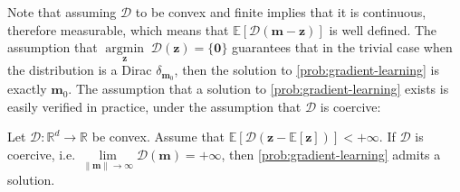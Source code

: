 \documentclass[10pt]{article} %
\renewcommand{\vec}[1]{\bm{#1}}
\newcommand{\bz}{\bm{z}}
\newcommand{\m}{\bm{m}}
\DeclareMathOperator{\argmininn}{argmin}
\newcommand{\argmin}[1]{ \underset{#1}{\argmininn} \;}
\newcommand{\E}[1]{\mathbb{E}\left[#1\right] }
\newcommand{\dist}{\mathcal{D}}
\begin{document}
Note that assuming $\mathcal{D}$ to be convex and finite implies that it is continuous, therefore measurable, which means that $\E{ \dist(\vec{m}-\vec{z})}$ is well defined.
The assumption that $\argmin{\vec{z}}\mathcal{D}(\vec{z})= \{\vec{0}\}$ guarantees that in the trivial case when the distribution is a Dirac $\delta_{\m_0}$, then the solution to  \eqref{prob:gradient-learning} is exactly $\m_0$.
The assumption that a solution to \eqref{prob:gradient-learning} exists is easily verified in practice, under the assumption that $\dist$ is coercive:

\begin{lemma}\label{L:D coercive implies median exists}
    Let $\dist : \mathbb{R}^d \to \mathbb{R}$ be convex.
    Assume that $\mathbb{E}\left[ \mathcal{D}(\bz - \mathbb{E}\left[ \bz \right]) \right] < + \infty$. 
    If $\dist$ is coercive, i.e. $\lim\limits_{\|\vec{m}\| \to \infty} \dist(\vec{m})= + \infty$, then \eqref{prob:gradient-learning} admits a solution.
\end{lemma}
\end{document}
